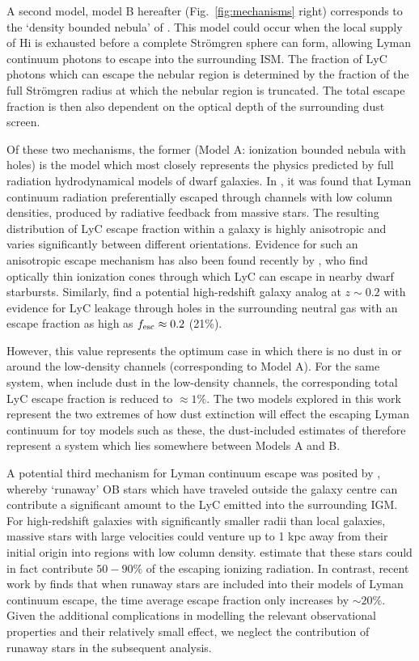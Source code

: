 A second model, model B hereafter (Fig.~\ref{fig:mechanisms} right) corresponds to the `density bounded nebula' of \citet{Zackrisson:2013iz}. This model could occur when the local supply of H{\sc i} is exhausted before a complete Str{\"o}mgren sphere can form, allowing Lyman continuum photons to escape into the surrounding ISM. The fraction of LyC photons which can escape the nebular region is determined by the fraction of the full Str{\"o}mgren radius at which the nebular region is truncated. The total escape fraction is then also dependent on the optical depth of the surrounding dust screen.

Of these two mechanisms, the former (Model A: ionization bounded nebula with holes) is the model which most closely represents the physics predicted by full radiation hydrodynamical models of dwarf galaxies. In \citet{Wise:2009fn}, it was found that Lyman continuum radiation preferentially escaped through channels with low column densities, produced by radiative feedback from massive stars. The resulting distribution of LyC escape fraction within a galaxy is highly anisotropic and varies significantly between different orientations. Evidence for such an anisotropic escape mechanism has also been found recently by \citet{Zastrow:2013bg}, who find optically thin ionization cones through which LyC can escape in nearby dwarf starbursts. Similarly, \citet{Borthakur:2014bz} find a potential high-redshift galaxy analog at $z\sim0.2$ with evidence for LyC leakage through holes in the surrounding neutral gas with an escape fraction as high as $f_{\rm{esc}} \approx 0.2$ (21\%). 

However, this value represents the optimum case in which there is no dust in or around the low-density channels (corresponding to Model A). For the same system, when \citet{Borthakur:2014bz} include dust in the low-density channels, the corresponding total LyC escape fraction is reduced to $\approx 1\%$. The two models explored in this work represent the two extremes of how dust extinction will effect the escaping Lyman continuum for toy models such as these, the dust-included estimates of \citet{Borthakur:2014bz} therefore represent a system which lies somewhere between Models A and B. 

A potential third mechanism for Lyman continuum escape was posited by \citet{Conroy:2012fc}, whereby `runaway' OB stars which have traveled outside the galaxy centre can contribute a significant amount to the LyC emitted into the surrounding IGM. For high-redshift galaxies with significantly smaller radii than local galaxies, massive stars with large velocities could venture up to 1 kpc away from their initial origin into regions with low column density. \citet{Conroy:2012fc} estimate that these stars could in fact contribute $50 - 90\%$ of the escaping ionizing radiation. In contrast, recent work by \citet{Kimm:2014gv} finds that when runaway stars are included into their models of Lyman continuum escape, the time average escape fraction only increases by $\sim20\%$. Given the additional complications in modelling the relevant observational properties and their relatively small effect, we neglect the contribution of runaway stars in the subsequent analysis. 

